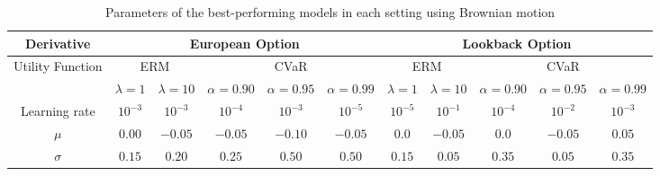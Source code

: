 \begin{table*}[htb]
    \caption{Parameters of the best-performing models in each setting using Brownian motion}
    \label{tab:tuning-results-brownian}
    \centering
    \begin{tabular}{c||c|c|c|c|c||c|c|c|c|c}
        \hline
        Derivative                        & \multicolumn{5}{c||}{European Option} & \multicolumn{5}{c}{Lookback Option}                                                                                                                                                    \\\hline
        \multirow{2}{*}{Utility Function} & \multicolumn{2}{c|}{ERM}              & \multicolumn{3}{c||}{CVaR}          & \multicolumn{2}{c|}{ERM} & \multicolumn{3}{c}{CVaR}                                                                                              \\
                                          & $\lambda=1$                           & $\lambda=10$                        & $\alpha=0.90$            & $\alpha=0.95$            & $\alpha=0.99$ & $\lambda=1$ & $\lambda=10$ & $\alpha=0.90$ & $\alpha=0.95$ & $\alpha=0.99$ \\\hline\hline
        Learning rate                     & $10^{-3}$                             & $10^{-3}$                           & $10^{-4}$                & $10^{-3}$                & $10^{-5}$     & $10^{-5}$   & $10^{-1}$    & $10^{-4}$     & $10^{-2}$     & $10^{-3}$     \\
        $\mu$                             & $0.00$                                & $-0.05$                             & $-0.05$                  & $-0.10$                  & $-0.05$       & $0.0$       & $-0.05$      & $0.0$         & $-0.05$       & $0.05$        \\
        $\sigma$                          & $0.15$                                & $0.20$                              & $0.25$                   & $0.50$                   & $0.50$        & $0.15$      & $0.05$       & $0.35$        & $0.05$        & $0.35$        \\
    \end{tabular}
\end{table*}
